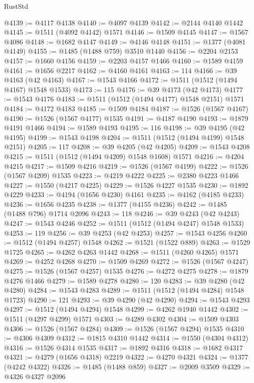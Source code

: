\begin{lexlean}{RustStd}
\begin{coremodule}
{\begin{coremodule}
{{{{{{{{{{{{{{{{{{{{{{{{{{{{{{{{{{{@4139 := @4117 @4138
@4140 := @4097 @4139
@4142 := @2144 @4140 @1442
@4145 := @1511 (@4092 @4142) @1571
@4146 := @1509 @4145
@4147 := @1567 @4086
@4148 := @1682 @4147
@4149 := @4146 @4148
@4151 := @1377 (@4081 @4149)
@4155 := @1485 (@1488 @759) @3510 @1440
@4156 := @2204 @2153
@4157 := @1660 @4156
@4159 := @2203 @4157 @1466
@4160 := @1589 @4159
@4161 := @1656 @2217
@4162 := @4160 @4161
@4163 := 114
@4166 := @39 @4163 (@42 @4163)
@4167 := @1543 @4166
@4172 := @1511 (@1512 (@1494 @4167) @1548 @1533)
@4173 := 115
@4176 := @39 @4173 (@42 @4173)
@4177 := @1543 @4176
@4183 := @1511 (@1512 (@1494 @4177) @1548 @2151) @1571
@4184 := @4172 @4183
@4185 := @1509 @4184
@4187 := @1526 (@1567 @4167)
@4190 := @1526 (@1567 @4177) @1535
@4191 := @4187 @4190
@4193 := @1879 @4191 @1466
@4194 := @1589 @4193
@4195 := 116
@4198 := @39 @4195 (@42 @4195)
@4199 := @1543 @4198
@4204 := @1511 (@1512 (@1494 @4199) @1548 @2151)
@4205 := 117
@4208 := @39 @4205 (@42 @4205)
@4209 := @1543 @4208
@4215 := @1511 (@1512 (@1494 @4209) @1548 @1608) @1571
@4216 := @4204 @4215
@4217 := @1509 @4216
@4219 := @1526 (@1567 @4199)
@4222 := @1526 (@1567 @4209) @1535
@4223 := @4219 @4222
@4225 := @2380 @4223 @1466
@4227 := @1550 (@4217 @4225)
@4229 := @1526 @4227 @1535
@4230 := @1892 @4229
@4233 := @4194 (@1656 @4230) @4161
@4235 := @4162 (@4185 @4233)
@4236 := @1656 @4235
@4238 := @1377 (@4155 @4236)
@4242 := @1485 (@1488 @796) @1714 @2096
@4243 := 118
@4246 := @39 @4243 (@42 @4243)
@4247 := @1543 @4246
@4252 := @1511 (@1512 (@1494 @4247) @1548 @1533)
@4253 := 119
@4256 := @39 @4253 (@42 @4253)
@4257 := @1543 @4256
@4260 := @1512 (@1494 @4257) @1548
@4262 := @1521 (@1522 @889)
@4263 := @1529 @1725
@4265 := @4262 @4263 @1442
@4268 := @1511 (@4260 @4265) @1571
@4269 := @4252 @4268
@4270 := @1509 @4269
@4272 := @1526 (@1567 @4247)
@4275 := @1526 (@1567 @4257) @1535
@4276 := @4272 @4275
@4278 := @1879 @4276 @1466
@4279 := @1589 @4278
@4280 := 120
@4283 := @39 @4280 (@42 @4280)
@4284 := @1543 @4283
@4289 := @1511 (@1512 (@1494 @4284) @1548 @1723)
@4290 := 121
@4293 := @39 @4290 (@42 @4290)
@4294 := @1543 @4293
@4297 := @1512 (@1494 @4294) @1548
@4299 := @4262 @1940 @1442
@4302 := @1511 (@4297 @4299) @1571
@4303 := @4289 @4302
@4304 := @1509 @4303
@4306 := @1526 (@1567 @4284)
@4309 := @1526 (@1567 @4294) @1535
@4310 := @4306 @4309
@4312 := @1815 @4310 @1442
@4314 := @1550 (@4304 @4312)
@4316 := @1526 @4314 @1535
@4317 := @1892 @4316
@4318 := @1682 @4317
@4321 := @4279 (@1656 @4318) @2219
@4322 := @4270 @4321
@4324 := @1377 (@4242 @4322)
@4326 := @1485 (@1488 @859)
@4327 := @2009 @3509
@4329 := @4326 @4327 @2096
}}}}}}}}}}}}}}}}}}}}}}}}}}}}}}}}}}}
\end{coremodule}}
\end{coremodule}
\end{lexlean}
